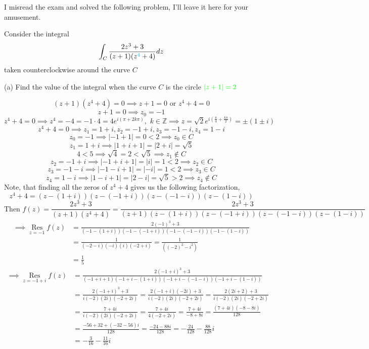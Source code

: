 \documentclass{article}
\newcommand\Z{\mathbb{Z}}
\def\res{\mathop{\text{Res}}\limits}
\begin{document}
I misread the exam and solved the following problem, I'll leave it
here for your amusement.

Consider the integral \[\int_C
  \frac{2z^3+3}{(z+1)(z^{\color{cyan} 4} +4)} dz\] taken counterclockwise around the
curve $C$

(a) Find the value of the integral when the curve $C$ is the circle
${\color{green}|z + 1| = 2}$


\[(z+1)(z^4+4) = 0\implies z+1 = 0 \text{ or } z^4+4 = 0\]
\[z+1 = 0 \implies z_0 = -1\]
\[z^4+4 = 0 \implies z^4 = -4 = -1\cdot 4 = 4 e^{i\left(  \pi+
      2k\pi\right)},\,\, k\in \Z \implies z =
  \sqrt{2}e^{i\left(  \frac{\pi}{4}+ \frac{k\pi}{2} \right)}= \pm(1\pm
  i)\]
\[z^4+4 = 0 \implies z_1 = 1+i,z_2 = -1+i, z_3 = -1-i, z_4 = 1-i\]
\[z_0 = -1 \implies |-1+1| = 0 <2 \implies z_0\in C\]
\[z_1 = 1+i \implies |1+i+1| = |2+i| = \sqrt{5}\]\[ 4<5 \implies
  \sqrt{4} = 2< \sqrt{5}  \implies z_1\not\in C\]
\[z_2 = -1+i \implies |-1+i+1| = |i| = 1 < 2\implies z_2 \in C\]
\[z_3 = -1-i \implies |-1-i+1| = |-i| = 1 < 2\implies  z_3 \in C\]
\[z_4 = 1-i \implies |1-i+1| = |2-i| = \sqrt{5} > 2\implies z_4
  \not\in C\]
Note, that finding all the zeros of $z^4+4$ gives us the following factorization,
\[z^4+4 = (z-(1+i))(z-(-1+i))(z-(-1-i))(z-(1-i)) \]
\[\text{Then } f(z) = \frac{2z^3+3}{(z+1)(z^4 +4)} = \frac{2z^3+3}{(z+1)(z-(1+i))(z-(-1+i))(z-(-1-i))(z-(1-i))}\]
\begin{align*}\implies \res_{z=-1} f(z) &=
  \frac{2(-1)^3+3}{(-1-(1+i))(-1-(-1+i))(-1-(-1-i))(-1-(1-i))}\\ &=
  \frac{1}{(-2-i)(-i)(i)(-2+i)}=  \frac{1}{((-2)^2-i^2)} \\&= \frac{1}{5}\end{align*}
\begin{align*}\implies \res_{z=-1+i} f(z) &=
                                       \frac{2(-1+i)^3+3}{(-1+i+1)(-1+i-(1+i))(-1+i-(-1-i))(-1+i-(1-i))}\\
                                     &=\frac{2(-1+i)^3+3}{i(-2)(2i)(-2+2i)}
                                     =\frac{2(-1+i)(-2i)+3}{i(-2)(2i)(-2+2i)}
                                     =\frac{2(2i+2)+3}{i(-2)(2i)(-2+2i)}\\
                                     &=\frac{7+4i}{i(-2)(2i)(-2+2i)}
                                     =\frac{7+4i}{4(-2+2i)}
                                       =\frac{7+4i}{-8+8i}
  = \frac{(7+4i)(-8-8i)}{128}\\  &=  \frac{-56 + 32 + (-32-56)i}{128} =
    \frac{-24 -88i}{128} = -\frac{24}{128} -\frac{88}{128}i \\
  &= -\frac{3}{16} - \frac{11}{16}i
\end{align*}
\end{document}
